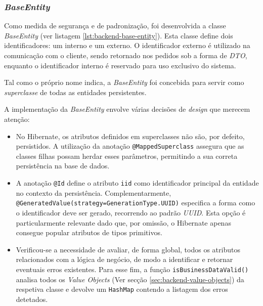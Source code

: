 \subsubsection{\textit{BaseEntity}}
\label{sec:backend-base-entity}

Como medida de segurança e de padronização, foi desenvolvida a classe \textit{BaseEntity} (ver listagem \ref{lst:backend-base-entity}). Esta classe define dois identificadores: um interno e um externo. O identificador externo é utilizado na comunicação com o cliente, sendo retornado nos pedidos sob a forma de \textit{DTO}, enquanto o identificador interno é reservado para uso exclusivo do sistema.

Tal como o próprio nome indica, a \textit{BaseEntity} foi concebida para servir como \textit{superclasse} de todas as entidades persistentes.

A implementação da \textit{BaseEntity} envolve várias decisões de \textit{design} que merecem atenção:

\begin{itemize}
    \item No \gls{Hibernate}, os atributos definidos em superclasses não são, por defeito, persistidos. A utilização da anotação \lstinline|@MappedSuperclass| assegura que as classes filhas possam herdar esses parâmetros, permitindo a sua correta persistência na base de dados.

    \item A anotação \lstinline|@Id| define o atributo \lstinline|iid| como identificador principal da entidade no contexto da persistência. Complementarmente, \lstinline|@GeneratedValue(strategy=GenerationType.UUID)| especifica a forma como o identificador deve ser gerado, recorrendo ao padrão \textit{UUID}. Esta opção é particularmente relevante dado que, por omissão, o \gls{Hibernate} apenas consegue popular atributos de tipos primitivos.
    
    \item Verificou-se a necessidade de avaliar, de forma global, todos os atributos relacionados com a lógica de negócio, de modo a identificar e retornar eventuais erros existentes. Para esse fim, a função \lstinline|isBusinessDataValid()| analisa todos os \textit{Value Objects} (Ver secção \ref{sec:backend-value-objects}) da respetiva classe e devolve um \lstinline|HashMap| contendo a listagem dos erros detetados.
\end{itemize}


